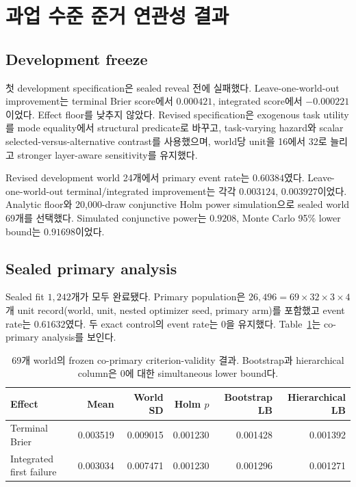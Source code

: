 \section{과업 수준 준거 연관성 결과}
\label{sec:validity-results}

\subsection{Development freeze}

첫 development specification은 sealed reveal 전에 실패했다.
Leave-one-world-out improvement는 terminal Brier score에서 \(0.000421\),
integrated score에서 \(-0.000221\)이었다. Effect floor를 낮추지 않았다.
Revised specification은 exogenous task utility를 mode equality에서 structural
predicate로 바꾸고, task-varying hazard와 scalar
selected-versus-alternative contrast를 사용했으며, world당 unit을 16에서
32로 늘리고 stronger layer-aware sensitivity를 유지했다.

Revised development world 24개에서 primary event rate는 \(0.60384\)였다.
Leave-one-world-out terminal/integrated improvement는 각각 \(0.003124\),
\(0.003927\)이었다. Analytic floor와 20,000-draw conjunctive Holm power
simulation으로 sealed world 69개를 선택했다. Simulated conjunctive power는
\(0.9208\), Monte Carlo 95\% lower bound는 \(0.91698\)이었다.

\subsection{Sealed primary analysis}

Sealed fit \(1{,}242\)개가 모두 완료됐다. Primary population은
\(26{,}496=69\times32\times3\times4\)개 unit record(world, unit, nested
optimizer seed, primary arm)를 포함했고 event rate는 \(0.61632\)였다. 두 exact
control의 event rate는 0을 유지했다. Table~\ref{tab:validity-primary}는
co-primary analysis를 보인다.

\begin{table}[ht]
\centering
\caption{69개 world의 frozen co-primary criterion-validity 결과. Bootstrap과
hierarchical column은 0에 대한 simultaneous lower bound다.}
\label{tab:validity-primary}
\begin{tabular}{lrrrrr}
\toprule
Effect & Mean & World SD & Holm \(p\) & Bootstrap LB & Hierarchical LB \\
\midrule
Terminal Brier
& 0.003519 & 0.009015 & 0.001230 & 0.001428 & 0.001392 \\
Integrated first failure
& 0.003034 & 0.007471 & 0.001230 & 0.001296 & 0.001271 \\
\bottomrule
\end{tabular}
\end{table}

